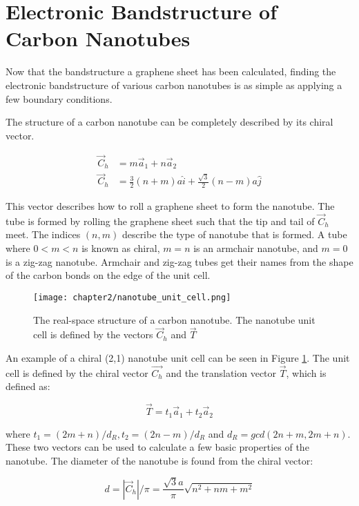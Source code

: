 \section{Electronic Bandstructure of Carbon Nanotubes} 

Now that the bandstructure a graphene sheet has been calculated, finding the electronic bandstructure of various carbon nanotubes is as simple as applying a few boundary conditions.

The structure of a carbon nanotube can be completely described by its chiral vector.

\begin{align}
    \vec{C}_h &= m\vec{a}_1 + n\vec{a}_2 \label{eq:chiral_vec} \\
    \vec{C}_h &= \frac{3}{2}(n+m)a\hat{i} + \frac{\sqrt{3}}{2}(n-m)a\hat{j} \nonumber
\end{align}

This vector describes how to roll a graphene sheet to form the nanotube. The tube is formed by rolling the graphene sheet such that the tip and tail of $\vec{C}_h$ meet. The indices $(n,m)$ describe the type of nanotube that is formed. A tube where $0<m<n$ is known as chiral, $m=n$ is an armchair nanotube, and $m=0$ is a zig-zag nanotube. Armchair and zig-zag tubes get their names from the shape of the carbon bonds on the edge of the unit cell.

\begin{figure}
    \centering
    \texttt{[image: chapter2/nanotube\_unit\_cell.png]}
    \caption{The real-space structure of a carbon nanotube. The nanotube unit cell is defined by the vectors $\vec{C}_h$ and $\vec{T}$}
    \label{fig:cnt_unit_cell}
\end{figure}

An example of a chiral (2,1) nanotube unit cell can be seen in Figure \ref{fig:cnt_unit_cell}. The unit cell is defined by the chiral vector $\vec{C_h}$ and the translation vector $\vec{T}$, which is defined as:

\begin{equation}
    \vec{T} = t_1\vec{a}_1 + t_2\vec{a}_2 \label{eq:translation}
\end{equation}
    
where $t_1 = (2m+n)/d_R, t_2 = (2n-m)/d_R$ and $d_R = gcd(2n+m, 2m+n)$. These two vectors can be used to calculate a few basic properties of the nanotube. The diameter of the nanotube is found from the chiral vector:

\begin{equation}
    d = \left| \vec{C}_h \right|/\pi = \frac{\sqrt{3}a}{\pi}\sqrt{n^2+nm+m^2}
    \label{eq:cnt_diameter}
\end{equation}

